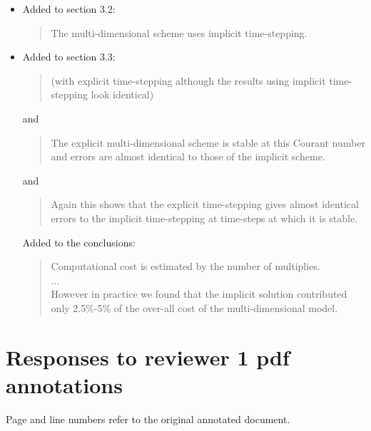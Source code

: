 \documentclass[12pt]{article}
\begin{document}
\begin{description}
\begin{itemize}
\item 
Added to section 3.2:
\begin{quote}
The multi-dimensional scheme uses implicit time-stepping.
\end{quote}

\item 
Added to section 3.3:
\begin{quote}
(with explicit time-stepping although the results using implicit time-stepping look identical)
\end{quote}
and
\begin{quote}
The explicit multi-dimensional scheme is stable at this Courant number and errors are almost identical to those of the implicit scheme.
\end{quote}
and
\begin{quote}
Again this shows that the explicit time-stepping gives almost identical errors to the implicit time-stepping at time-steps at which it is stable.
\end{quote}

Added to the conclusions:
\begin{quote}
Computational cost is estimated by the number of multiplies.\\
...\\
However in practice we found that the implicit solution contributed only 2.5\%-5\% of the over-all cost of the multi-dimensional model.
\end{quote}
\end{itemize}
\end{description}

\section*{Responses to reviewer 1 pdf annotations}

Page and line numbers refer to the original annotated document.
\end{document}
